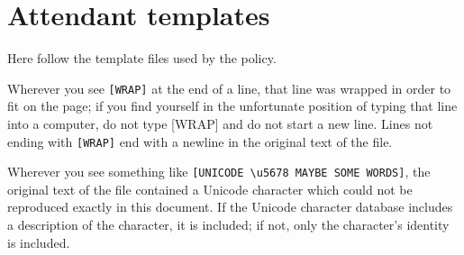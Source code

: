 \chapter{Attendant templates}
\label{AttendantTemplates}
Here follow the template files used by the policy.

Wherever you see \verb![WRAP]! at the end of a line, that line was wrapped
in order to fit on the page; if you find yourself in the unfortunate
position of typing that line into a computer, do not type [WRAP] and do
not start a new line. Lines not ending with \verb![WRAP]! end with a
newline in the original text of the file.

Wherever you see something like \verb![UNICODE \u5678 MAYBE SOME WORDS]!,
the original text of the file contained a Unicode character which could
not be reproduced exactly in this document. If the Unicode character
database includes a description of the character, it is included; if not,
only the character's identity is included.


